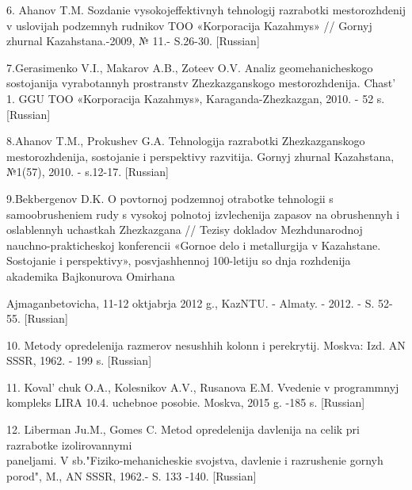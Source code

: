 \begin{references}
6. Ahanov T.M. Sozdanie vysokojeffektivnyh tehnologij razrabotki
mestorozhdenij v uslovijah podzemnyh rudnikov TOO «Korporacija Kazahmys»
// Gornyj zhurnal Kazahstana.-2009, № 11.- S.26-30. {[}Russian{]}

7.Gerasimenko V.I., Makarov A.B., Zoteev O.V. Analiz geomehanicheskogo
sostojanija vyrabotannyh prostranstv Zhezkazganskogo mestorozhdenija.
Chast'{} 1. GGU TOO «Korporacija Kazahmys»,
Karaganda-Zhezkazgan, 2010. - 52 s. {[}Russian{]}

8.Ahanov T.M., Prokushev G.A. Tehnologija razrabotki Zhezkazganskogo
mestorozhdenija, sostojanie i perspektivy razvitija. Gornyj zhurnal
Kazahstana, №1(57), 2010. - s.12-17. {[}Russian{]}

9.Bekbergenov D.K. O povtornoj podzemnoj otrabotke tehnologii s
samoobrusheniem rudy s vysokoj polnotoj izvlechenija zapasov na
obrushennyh i oslablennyh uchastkah Zhezkazgana // Tezisy dokladov
Mezhdunarodnoj nauchno-prakticheskoj konferencii «Gornoe delo i
metallurgija v Kazahstane. Sostojanie i perspektivy», posvjashhennoj
100-letiju so dnja rozhdenija akademika Bajkonurova Omirhana

Ajmaganbetovicha, 11-12 oktjabrja 2012 g., KazNTU. - Almaty. - 2012. -
S. 52-55. {[}Russian{]}

10. Metody opredelenija razmerov nesushhih kolonn i perekrytij. Moskva:
Izd. AN SSSR, 1962. - 199 s. {[}Russian{]}

11. Koval' chuk O.A., Kolesnikov A.V., Rusanova E.M.
Vvedenie v programmnyj kompleks LIRA 10.4. uchebnoe posobie. Moskva,
2015 g. -185 s. {[}Russian{]}

12. Liberman Ju.M., Gomes C. Metod opredelenija davlenija na celik pri
razrabotke izolirovannymi \\paneljami. V sb."Fiziko-mehanicheskie
svojstva, davlenie i razrushenie gornyh porod", M., AN SSSR, 1962.- S.
133 -140. {[}Russian{]}
\end{references}

